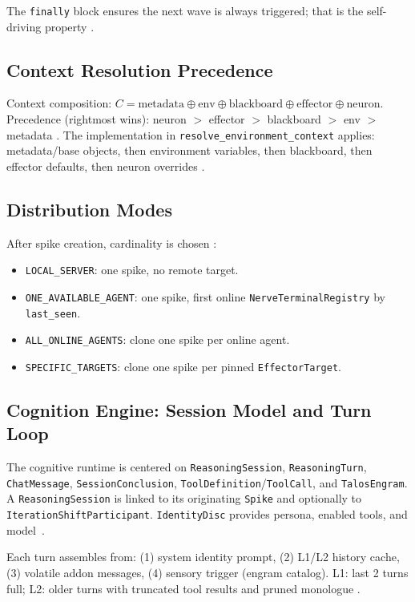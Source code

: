 \documentclass[11pt]{article}
\begin{document}
	The \texttt{finally} block ensures the next wave is always triggered; that is the self-driving property \cite{talosLiveCodebase}.

	\subsection{Context Resolution Precedence}
	Context composition: $C = \text{metadata} \oplus \text{env} \oplus \text{blackboard} \oplus \text{effector} \oplus \text{neuron}$. Precedence (rightmost wins): neuron $>$ effector $>$ blackboard $>$ env $>$ metadata \cite{talosCNS,talosCombined}. The implementation in \texttt{resolve\_environment\_context} applies: metadata/base objects, then environment variables, then blackboard, then effector defaults, then neuron overrides \cite{talosLiveCodebase}.

	\subsection{Distribution Modes}
	After spike creation, cardinality is chosen \cite{talosCNS,talosCombined}:
	\begin{itemize}
		\item \texttt{LOCAL\_SERVER}: one spike, no remote target.
		\item \texttt{ONE\_AVAILABLE\_AGENT}: one spike, first online \texttt{NerveTerminalRegistry} by \texttt{last\_seen}.
		\item \texttt{ALL\_ONLINE\_AGENTS}: clone one spike per online agent.
		\item \texttt{SPECIFIC\_TARGETS}: clone one spike per pinned \texttt{EffectorTarget}.
	\end{itemize}

	\subsection{Cognition Engine: Session Model and Turn Loop}
	The cognitive runtime is centered on \texttt{ReasoningSession}, \texttt{ReasoningTurn}, \texttt{ChatMessage}, \texttt{SessionConclusion}, \texttt{ToolDefinition}/\texttt{ToolCall}, and \texttt{TalosEngram}. A \texttt{ReasoningSession} is linked to its originating \texttt{Spike} and optionally to \texttt{IterationShiftParticipant}. \texttt{IdentityDisc} provides persona, enabled tools, and model~\cite{talosLiveCodebase}.

	Each turn assembles from: (1) system identity prompt, (2) L1/L2 history cache, (3) volatile addon messages, (4) sensory trigger (engram catalog). L1: last 2 turns full; L2: older turns with truncated tool results and pruned monologue \cite{talosFrontal,talosLiveCodebase}.
\end{document}
